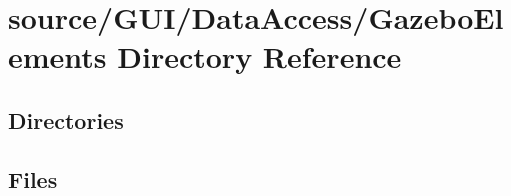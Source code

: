 \section{source/\+G\+U\+I/\+Data\+Access/\+Gazebo\+Elements Directory Reference}
\label{dir_88c72c04e5af6b12aa1a3344d97c0cfe}
\subsection*{Directories}
\begin{DoxyCompactItemize}
\end{DoxyCompactItemize}
\subsection*{Files}
\begin{DoxyCompactItemize}
\end{DoxyCompactItemize}
